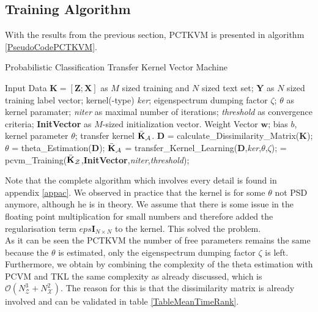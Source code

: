 \subsection{Training Algorithm}\label{InSubSecTraining}
With the results from the previous section, \acs{PCTKVM} is presented in algorithm \ref{PseudoCodePCTKVM}.
\begin{algorithm}
	\caption{Probabilistic Classification Transfer Kernel Vector Machine }\label{PseudoCodePCTKVM}	
	\begin{algorithmic}[1]
		\Require Input Data $\mathbf{K} = [\mathbf{Z};\mathbf{X}]$ as $M$ sized training and $N$ sized text set; $\mathbf{Y}$ as $N$ sized training label vector; kernel(-type) \textit{ker}; eigenspectrum dumping factor $\zeta$; $\theta$ as kernel paramater; \textit{niter} as maximal number of iterations; \textit{threshold} as convergence criteria; \textbf{InitVector} as $M$-sized initialization vector.
		\Ensure Weight Vector $\mathbf{w}$; bias $b$, kernel parameter $\theta$; transfer kernel $\bar{\mathbf{K}}_\mathcal{A}$.
		\State $\mathbf{D}$ = calculate\_Dissimilarity\_Matrix($\mathbf{K}$);
		\State $\theta$ = theta\_Estimation($\mathbf{D}$);  
		\State $\bar{\mathbf{K}}_\mathcal{A}$ = transfer\_Kernel\_Learning($\mathbf{D}$,\textit{ker},$\theta$,$\zeta$); 
		\State [$\mathbf{w}$,$b$] = pcvm\_Training($\bar{\mathbf{K}}_\mathcal{Z}$,\textbf{InitVector},\textit{niter},\textit{threshold}); 
	\end{algorithmic}
\end{algorithm}
Note that the complete algorithm which involves every detail is found in appendix \ref{appac}. We observed in practice that the kernel is for some $\theta$ not \acs{PSD} anymore, although he is in theory.
We assume that there is some issue in the floating point multiplication for small numbers and therefore added the regularisation term $eps\mathbf{I}_{N\times N}$ to the kernel. 
This solved the problem.\\
As it can be seen the \acs{PCTKVM} the number of free parameters remains the same because the $\theta$ is estimated, only the eigenspectrum dumping factor $\zeta$ is left.
Furthermore, we obtain by combining the complexity of the theta estimation with \acs{PCVM} and \acs{TKL} the same complexity as already discussed, which is $\mathcal{O}(N_\mathcal{Z}^3+N_\mathcal{X}^2)$. The reason for this is that the dissimilarity matrix is already involved and can be validated in table \ref{TableMeanTimeRank}.
